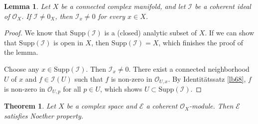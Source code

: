 \documentclass[12pt,b5paper,notitlepage]{report}
\theoremstyle{definition}
\theoremstyle{plain}
\newtheorem{thm}[df]{Theorem}
\newtheorem{lm}[df]{Lemma}
\newcommand{\mc}{\mathcal}
\newcommand{\scr}{\mathscr}
\newcommand{\Supp}{\mathrm{Supp}}
\numberwithin{equation}{section}
\begin{document}
\begin{lm}\label{lb176}
Let $X$ be a connected complex manifold, and let $\mc I$ be a coherent ideal of $\scr O_X$. If $\mc I\neq 0_X$, then $\mc I_x\neq 0$ for every $x\in X$.
\end{lm}

\begin{proof}
We know that $\Supp(\mc I)$ is a (closed) analytic subset of $X$. If we can show that $\Supp(\mc I)$ is open in $X$, then $\Supp(\mc I)=X$, which finishes the proof of the lemma. 

Choose any $x\in\Supp(\mc I)$. Then $\mc I_x\neq 0$. There exist a connected neighborhood $U$ of $x$ and $f\in\mc I(U)$ such that $f$ is non-zero in $\scr O_{U,x}$. By Identit\"atssatz \ref{lb68}, $f$ is non-zero in $\scr O_{U,p}$ for all $p\in U$, which shows $U\subset\Supp(\mc I)$.
\end{proof}




\begin{thm}\label{lb331}
Let $X$ be a complex space and $\scr E$ a coherent $\scr O_X$-module. Then $\scr E$ satisfies Noether property.
\end{thm}
\end{document}
